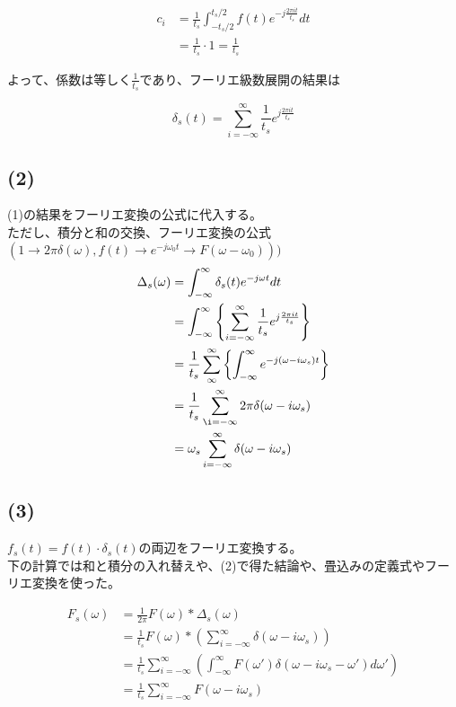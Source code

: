 \documentclass[a4paper,12pt,xelatex,ja=standard]{bxjsarticle}
\begin{document}
\begin{equation*}
  \begin{split}
    c_i
      &= \frac{1}{t_s}\int^{t_s/2}_{-t_s/2}f(t) e^{-j \frac{2 \pi i t}{t_s}}dt \\
      &= \frac{1}{t_s} \cdot 1 = \frac{1}{t_s}
  \end{split}
\end{equation*}

よって、係数は等しく$\frac{1}{t_s}$であり、フーリエ級数展開の結果は

\[
  \delta_s(t) = \sum^{\infty}_{i = -\infty}\frac{1}{t_s}e^{j \frac{2 \pi i t}{t_s}}
\]

\subsection*{(2)}
(1)の結果をフーリエ変換の公式に代入する。\\
ただし、積分と和の交換、フーリエ変換の公式$\left( 1 \to 2\pi \delta(\omega), f(t) \to e^{-j \omega_0 t} \to F(\omega - \omega_0)\right))$
\begin{equation*}
  \begin{split}
    \Delta_s(\omega)
      &= \int^{\infty}_{-\infty}\delta_s(t)e^{- j \omega t}dt \\
      &= \int^{\infty}_{-\infty}\left\{\sum^{\infty}_{i = -\infty} \frac{1}{t_s}e^{j \frac{2 \pi i t}{t_s}}\right\} \\
      &= \frac{1}{t_s} \sum^{\infty}_{\infty}\left\{\int^{\infty}_{-\infty} e^{-j(\omega - i\omega_s)t}\right\} \\
      &= \frac{1}{t_s} \sum^{\infty}_{\i= -\infty}2\pi \delta(\omega - i \omega_s) \\
      &= \omega_s \sum^{\infty}_{i = -\infty}\delta(\omega - i \omega_s)
  \end{split}
\end{equation*}

\subsection*{(3)}
$f_s(t) = f(t) \cdot \delta_s(t)$の両辺をフーリエ変換する。\\
下の計算では和と積分の入れ替えや、(2)で得た結論や、畳込みの定義式やフーリエ変換を使った。

\begin{equation*}
  \begin{split}
    F_s(\omega)
      &= \frac{1}{2 \pi}F(\omega) * \Delta_s(\omega) \\
      &= \frac{1}{t_s}F(\omega) * \left(\sum^{\infty}_{i = -\infty}\delta(\omega - i \omega_s)\right) \\
      &= \frac{1}{t_s} \sum^{\infty}_{i = - \infty} \left(\int^{\infty}_{-\infty}F(\omega')\delta(\omega - i\omega_s - \omega') d\omega'\right) \\
      &= \frac{1}{t_s} \sum^{\infty}_{i = - \infty} F(\omega - i\omega_s) \\
  \end{split}
\end{equation*}
\end{document}
